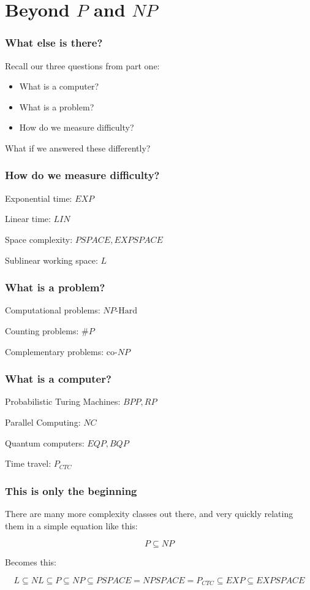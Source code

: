 \documentclass[aspectratio=169]{beamer}
\begin{document}
\section{Beyond $P$ and $NP$}

\begin{frame}
\frametitle{What else is there?}
Recall our three questions from part one:
\begin{itemize}
    \item What is a computer?
    \item What is a problem?
    \item How do we measure difficulty?
\end{itemize}
What if we answered these differently?
\end{frame}

\begin{frame}
\frametitle{How do we measure difficulty?}
Exponential time: $EXP$

Linear time: $LIN$

Space complexity: $PSPACE, EXPSPACE$

Sublinear working space: $L$
\end{frame}

\begin{frame}
\frametitle{What is a problem?}
Computational problems: $NP\text{-Hard}$

Counting problems: $\#P$

Complementary problems: $\text{co-}NP$
\end{frame}

\begin{frame}
\frametitle{What is a computer?}
Probabilistic Turing Machines: $BPP, RP$

Parallel Computing: $NC$

Quantum computers:  $EQP, BQP$

Time travel: $P_{CTC}$
\end{frame}

\begin{frame}
\frametitle{This is only the beginning}
There are many more complexity classes out there, and very quickly relating them in a simple equation like this:

$$P \subseteq NP$$

Becomes this:

$$L \subseteq NL \subseteq P \subseteq NP \subseteq PSPACE = NPSPACE = P_{CTC} \subseteq EXP \subseteq EXPSPACE$$
\end{frame}
\end{document}
